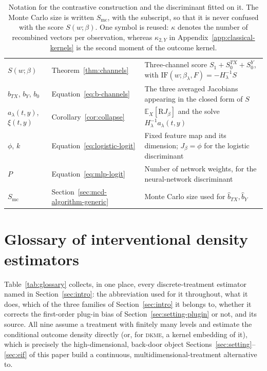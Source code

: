 \documentclass[11pt]{article}
\theoremstyle{plain}
\theoremstyle{definition}
\theoremstyle{remark}
\newcommand{\pE}{\ensuremath{\mathbb{E}}}
\newcommand{\DensityRatio}{\text{R}}
\newcommand{\ks}{k}
\newcommand{\IF}{\mathrm{IF}}
\newcommand{\score}{S}
\begin{document}
\begin{table}[p]
\begin{tabular}{@{}llp{8.2cm}@{}}
$\score(w;\beta)$ & Theorem~\ref{thm:channels} & Three-channel score $\score_1 + \score_0^{TX} + \score_0^{Y}$, with $\IF(w;\beta_\lambda,F) = -H_\lambda^{-1}\score$ \\
$b_{TX}$, $b_Y$, $b_0$ & Equation~\eqref{eq:b-channels} & The three averaged Jacobians appearing in the closed form of $\score$ \\
$a_\lambda(t,y)$, $\xi(t,y)$ & Corollary~\ref{cor:collapse} & $\pE_X[\DensityRatio J_\beta]$ and the solve $H_\lambda^{-1}a_\lambda(t,y)$ \\
$\phi$, $\ks$ & Equation~\eqref{eq:logistic-logit} & Fixed feature map and its dimension; $J_\beta = \phi$ for the logistic discriminant \\
$P$ & Equation~\eqref{eq:mlp-logit} & Number of network weights, for the neural-network discriminant \\
$S_{\mathrm{mc}}$ & Section~\ref{sec:mcd-algorithm-generic} & Monte Carlo size used for $\widehat b_{TX},\widehat b_Y$ \\
\bottomrule
\end{tabular}
\caption{Notation for the contrastive construction and the discriminant fitted on it. The
Monte Carlo size is written $S_{\mathrm{mc}}$, with the subscript, so that it is never confused
with the score $\score(w;\beta)$. One symbol is reused: $\kappa$ denotes the number of
recombined vectors per observation, whereas $\kappa_{2,Y}$ in
Appendix~\ref{app:classical-kernels} is the second moment of the outcome kernel.}
\label{tab:notation-b}
\end{table}

\section{Glossary of interventional density estimators}
\label{app:glossary}

Table~\ref{tab:glossary} collects, in one place, every discrete-treatment estimator named in
Section~\ref{sec:intro}: the abbreviation used for it throughout, what it does, which of the
three families of Section~\ref{sec:intro} it belongs to, whether it corrects the first-order
plug-in bias of Section~\ref{sec:setting-plugin} or not, and its source. All nine assume a
treatment with finitely many levels and estimate the conditional outcome density directly (or,
for \textsc{dkme}, a kernel embedding of it), which is precisely the high-dimensional,
back-door object Sections~\ref{sec:setting}--\ref{sec:eif} of this paper build a continuous,
multidimensional-treatment alternative to.
\end{document}
